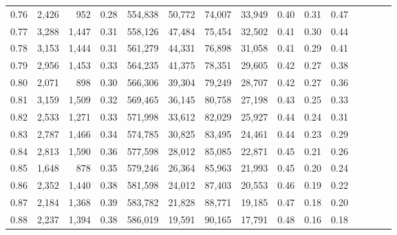 \begin{tabular}{rrrcrrrrrrrrrrr}
0.76 &   2,426 &    952 &                                       0.28 &  554,838 &   50,772 &   74,007 &   33,949 &  0.40 &  0.31 &                         0.47 \\
0.77 &   3,288 &  1,447 &                                       0.31 &  558,126 &   47,484 &   75,454 &   32,502 &  0.41 &  0.30 &                         0.44 \\
0.78 &   3,153 &  1,444 &                                       0.31 &  561,279 &   44,331 &   76,898 &   31,058 &  0.41 &  0.29 &                         0.41 \\
0.79 &   2,956 &  1,453 &                                       0.33 &  564,235 &   41,375 &   78,351 &   29,605 &  0.42 &  0.27 &                         0.38 \\
0.80 &   2,071 &    898 &                                       0.30 &  566,306 &   39,304 &   79,249 &   28,707 &  0.42 &  0.27 &                         0.36 \\
0.81 &   3,159 &  1,509 &                                       0.32 &  569,465 &   36,145 &   80,758 &   27,198 &  0.43 &  0.25 &                         0.33 \\
0.82 &   2,533 &  1,271 &                                       0.33 &  571,998 &   33,612 &   82,029 &   25,927 &  0.44 &  0.24 &                         0.31 \\
0.83 &   2,787 &  1,466 &                                       0.34 &  574,785 &   30,825 &   83,495 &   24,461 &  0.44 &  0.23 &                         0.29 \\
0.84 &   2,813 &  1,590 &                                       0.36 &  577,598 &   28,012 &   85,085 &   22,871 &  0.45 &  0.21 &                         0.26 \\
0.85 &   1,648 &    878 &                                       0.35 &  579,246 &   26,364 &   85,963 &   21,993 &  0.45 &  0.20 &                         0.24 \\
0.86 &   2,352 &  1,440 &                                       0.38 &  581,598 &   24,012 &   87,403 &   20,553 &  0.46 &  0.19 &                         0.22 \\
0.87 &   2,184 &  1,368 &                                       0.39 &  583,782 &   21,828 &   88,771 &   19,185 &  0.47 &  0.18 &                         0.20 \\
0.88 &   2,237 &  1,394 &                                       0.38 &  586,019 &   19,591 &   90,165 &   17,791 &  0.48 &  0.16 &                         0.18 \\

\end{tabular}
